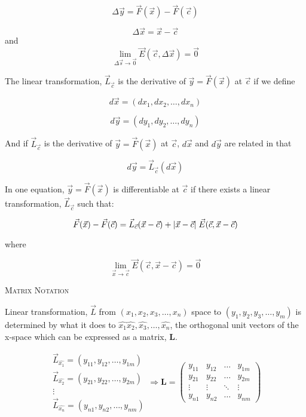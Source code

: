 \documentclass{article}
\begin{document}
\[
\Delta{\vec{y}} = \vec{F}(\vec{x}) - \vec{F}(\vec{c})
\]

\[
\Delta{\vec{x}} = \vec{x} - \vec{c}
\]
and
\[
\lim_{\Delta{\vec{s}} \to \vec{0}} \vec{E}(\vec{c}, {\Delta{\vec{x}}}) = \vec{0}
\]

The linear transformation, $\vec{L}_{\vec{c}}$ is the derivative of $\vec{y} = \vec{F}(\vec{x})$ at $\vec{c}$ if we define

\[
d\vec{x} = (dx_1, dx_2, \ldots, dx_n)
\]

\[
d\vec{y} = (dy_1, dy_2, \ldots, dy_n)
\]

And if $\vec{L}_{\vec{c}}$ is the derivative of $\vec{y} = \vec{F}(\vec{x})$ at $\vec{c}$, $d\vec{x}$ and $d\vec{y}$ are related in that 

\[
d\vec{y} = \vec{L}_{\vec{c}}\left( d\vec{x} \right)
\]

In one equation, $\vec{y} = \vec{F}(\vec{x})$ is differentiable at $\vec{c}$ if there exists a linear transformation, $\vec{L}_{\vec{c}}$ such that:

\[
\vec{F}(\vec{x}) - \vec{F}(\vec{c}) = \vec{L}_{\vec{c}}(\vec{x} - \vec{c}) + \lvert \vec{x} - \vec{c} \rvert \hspace{1mm} \vec{E}(\vec{c}, \vec{x} - \vec{c})
\]

where

\[
\lim_{\vec{x} \to \vec{c}} \vec{E}(\vec{c}, \vec{x} - \vec{c}) = \vec{0}
\]


\bigskip

\textsc{Matrix Notation}

Linear transformation, $\vec{L}$ from $(x_1, x_2, x_3, \ldots, x_n)$ space to $(y_1, y_2, y_3, \ldots, y_m)$ is determined by what it does to $\hat{x_1} \hat{x_2}, \hat{x_3}, \ldots, \hat{x_n}$, the orthogonal unit vectors of the x-space which can be expressed as a matrix, \textbf{L}.

\[
\begin{array}{c}
\vec{L}_{\hat{x_1}} = (y_{11}, y_{12}, \ldots, y_{1m})   \\
\vec{L}_{\hat{x_2}} = (y_{21}, y_{22}, \ldots, y_{2m})   \\
\vdots \\
\vec{L}_{\hat{x_n}} = (y_{n1}, y_{n2}, \ldots, y_{nm})
\end{array} 
\Rightarrow
\textbf{L} = \left( \begin{array}{cccc}
y_{11} & y_{12} & \ldots & y_{1m}\\
y_{21} & y_{22} & \ldots & y_{2m}\\
 \vdots & \vdots & \ddots & \vdots\\
y_{n1} & y_{n2} & \ldots & y_{nm}
\end{array}\right)
\]
\end{document}
